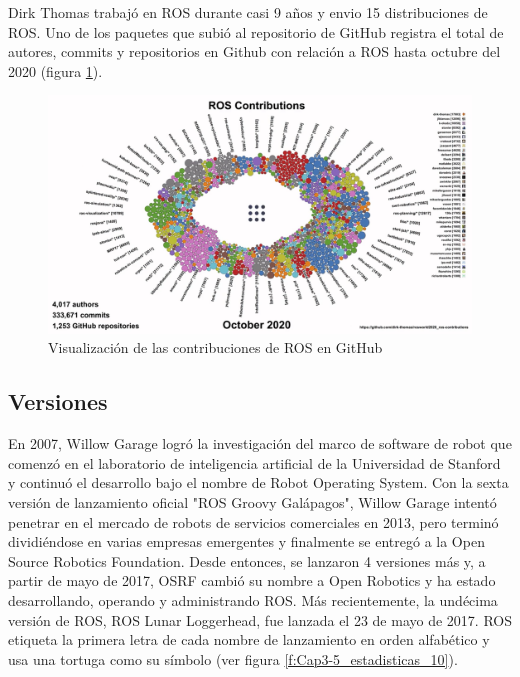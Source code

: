             Dirk Thomas trabajó en ROS durante casi 9 años y envio 15 distribuciones de ROS. Uno de los paquetes que subió al repositorio de GitHub registra el total de autores, commits y repositorios en Github con relación a ROS hasta octubre del 2020 (figura \ref{f:Cap3-5_estadisticas_9}).
        
            \begin{figure}[htb]
            \centering
            \includegraphics[width=0.99\linewidth]{Main/Chapter3/Images3/repo_git_2.png}
            \caption{Visualización de las contribuciones de ROS en GitHub \cite{gitreposito}}
            \label{f:Cap3-5_estadisticas_9}
            \end{figure} 
    
        \newpage

    \subsection{Versiones}
            En 2007, Willow Garage logró la investigación del marco de software de robot que comenzó en el laboratorio de inteligencia artificial de la Universidad de Stanford y continuó el desarrollo bajo el nombre de Robot Operating System. Con la sexta versión de lanzamiento oficial "ROS Groovy Galápagos", Willow Garage intentó penetrar en el mercado de robots de servicios comerciales en 2013, pero terminó dividiéndose en varias empresas emergentes y finalmente se entregó a la Open Source Robotics Foundation. Desde entonces, se lanzaron 4 versiones más y, a partir de mayo de 2017, OSRF cambió su nombre a Open Robotics y ha estado desarrollando, operando y administrando ROS. Más recientemente, la undécima versión de ROS, ROS Lunar Loggerhead, fue lanzada el 23 de mayo de 2017. ROS etiqueta la primera letra de cada nombre de lanzamiento en orden alfabético y usa una tortuga como su símbolo (ver figura \eqref{f:Cap3-5_estadisticas_10}).
            

